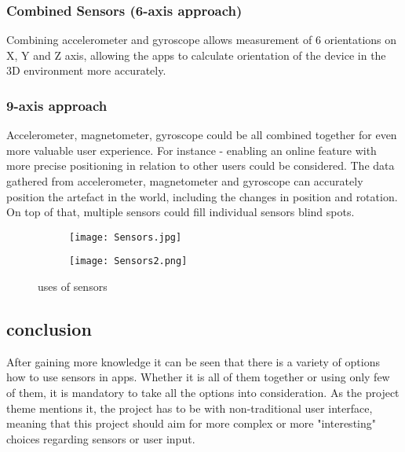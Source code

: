 \subsubsection*{Combined Sensors (6-axis approach)}
Combining accelerometer and gyroscope allows measurement of 6 orientations on X, Y and Z axis, allowing the apps to calculate orientation of the device in the 3D environment more accurately.
\subsubsection*{9-axis approach}
Accelerometer, magnetometer, gyroscope could be all combined together for even more valuable user experience. For instance - enabling an online feature with more precise positioning in relation to other users could be considered. The data gathered from accelerometer, magnetometer and gyroscope can accurately position the artefact in the world, including the changes in position and rotation. On top of that, multiple sensors could fill individual sensors blind spots. 

\begin{figure}[H]
\begin{subfigure}{.5\textwidth}
  \centering
  \texttt{[image: Sensors.jpg]}
\end{subfigure}%
\begin{subfigure}{.5\textwidth}
  \centering
  \texttt{[image: Sensors2.png]}
\end{subfigure}
\caption{uses of sensors}
\end{figure}


\subsection{conclusion}
After gaining more knowledge it can be seen that there is a variety of options how to use sensors in apps. Whether it is all of them together or using only few of them, it is mandatory to take all the options into consideration. As the project theme mentions it, the project has to be with non-traditional user interface, meaning that this project should aim for more complex or more "interesting" choices regarding sensors or user input.
